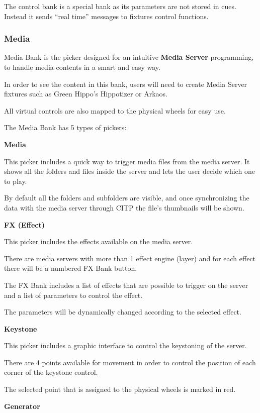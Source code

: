 \documentclass[
]{article}
\begin{document}
The control bank is a special bank as its parameters are not stored in cues. Instead it sends ``real time'' messages to fixtures control functions.

\hypertarget{media}{%
\subsubsection{Media}\label{media}}

Media Bank is the picker designed for an intuitive \textbf{Media Server} programming, to handle media contents in a smart and easy way.

In order to see the content in this bank, users will need to create Media Server fixtures such as Green Hippo's Hippotizer or Arkaos.

All virtual controls are also mapped to the physical wheels for easy use.

The Media Bank has 5 types of pickers:

\textbf{Media}

This picker includes a quick way to trigger media files from the media server. It shows all the folders and files inside the server and lets the user decide which one to play.

By default all the folders and subfolders are visible, and once synchronizing the data with the media server through CITP the file's thumbnails will be shown.

\textbf{FX (Effect)}

This picker includes the effects available on the media server.

There are media servers with more than 1 effect engine (layer) and for each effect there will be a numbered FX Bank button.

The FX Bank includes a list of effects that are possible to trigger on the server and a list of parameters to control the effect.

The parameters will be dynamically changed according to the selected effect.

\textbf{Keystone}

This picker includes a graphic interface to control the keystoning of the server.

There are 4 points available for movement in order to control the position of each corner of the keystone control.

The selected point that is assigned to the physical wheels is marked in red.

\textbf{Generator}
\end{document}

